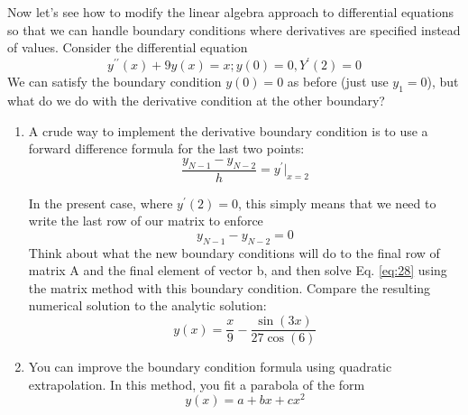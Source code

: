 	Now let\rq s see how to modify the linear algebra approach to differential equations
so that we can handle boundary conditions where derivatives are specified instead
of values. Consider the differential equation
	\begin{equation}\label{eq:28}
		y^{\prime\prime}(x) + 9y(x) = x   ;    y(0) = 0,    Y^\prime(2) = 0
	\end{equation}
	We can satisfy the boundary condition $y(0) = 0$ as before (just use $y_1 = 0$), but
what do we do with the derivative condition at the other boundary?
\begin{problem} \label{P2.4}

\begin{enumerate}[label=(\alph*)]
\item	A crude way to implement the derivative boundary condition is to use a forward difference formula for the last two points:
	\begin{equation*}
		\frac{y_{N-1}-y_{N-2}}{h} = y^\prime\vert_{x=2}
	\end{equation*}
	
	In the present case, where $y^\prime(2) = 0$, this simply means that we need to write the last row of our matrix to enforce
	\begin{equation*}
		y_{N-1}-y_{N-2}= 0
	\end{equation*}
	Think about what the new boundary conditions will do to the final row of matrix A and the final element of vector b, and then solve Eq. \ref{eq:28} using the matrix method with this boundary condition. Compare the resulting numerical solution to the analytic solution:
	\begin{equation*}
		y(x) = \frac{x}{9} - \frac{\sin(3x)}{27\cos(6)}
	\end{equation*}

	\item You can improve the boundary condition formula using quadratic extrapolation. In this method, you fit a parabola of the form
	\begin{equation}\label{eq:29}
		y(x) = a+bx+cx^2
	\end{equation}
	

\end{enumerate}
\end{problem}

